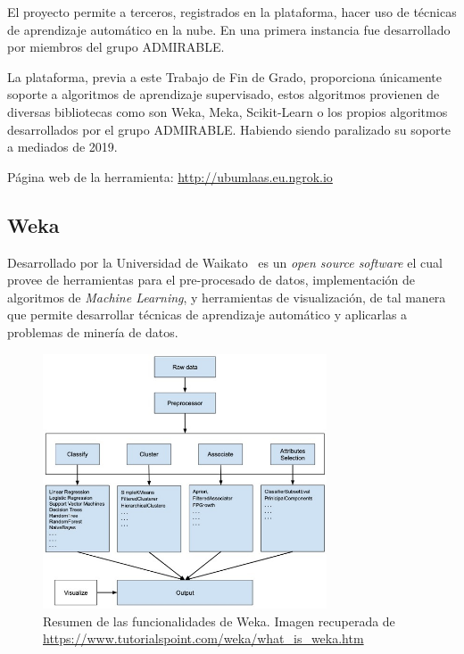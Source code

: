 El proyecto permite a terceros, registrados en la plataforma, hacer uso de técnicas de aprendizaje automático en la nube. En una primera instancia fue desarrollado por miembros del grupo ADMIRABLE.

La plataforma, previa a este Trabajo de Fin de Grado, proporciona únicamente soporte a algoritmos de aprendizaje supervisado, estos algoritmos provienen de diversas bibliotecas como son Weka, Meka, Scikit-Learn o los propios algoritmos desarrollados por el grupo ADMIRABLE. Habiendo siendo paralizado su soporte a mediados de 2019.

Página web de la herramienta: \url{http://ubumlaas.eu.ngrok.io}

\subsection{Weka}\label{subsec:Weka}
Desarrollado por la Universidad de Waikato~\cite{witten2005practical} es un \textit{open source software} el cual provee de herramientas para el pre-procesado de datos, implementación de algoritmos de \textit{Machine Learning}, y herramientas de visualización, de tal manera que permite desarrollar técnicas de aprendizaje automático y aplicarlas a problemas de minería de datos. 

\begin{figure}
\centering
\includegraphics[width=0.75\textwidth]{../img/memoria/weka-summary}
\caption[Resumen de las funcionalidades de Weka.]{Resumen de las funcionalidades de Weka. Imagen recuperada de \url{https://www.tutorialspoint.com/weka/what_is_weka.htm}}\label{fig:whatisweka}
\end{figure}

